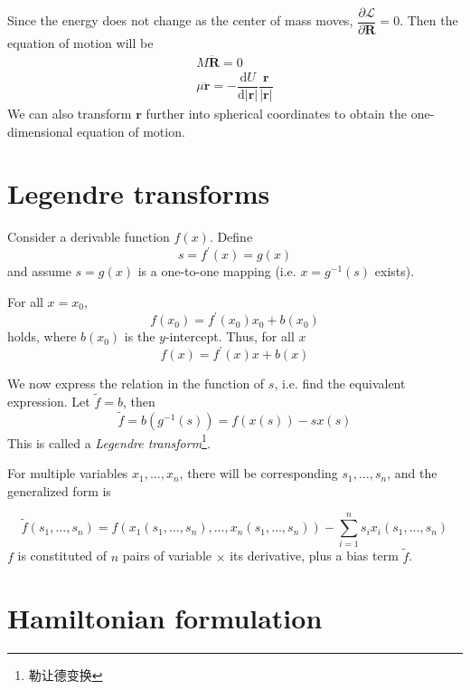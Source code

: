 \documentclass[
  10pt,
  twoside,
  openany,
  b5paper, %
  colorscheme = bootstrap-v4, %
]{qyxf-book}
\numberwithin{equation}{section}
\newcommand{\md}{\mathrm{d}}
\newcommand{\der}[2]{\dfrac{\md #1}{\md #2}}
\newcommand{\p}[2]{\dfrac{\partial #1}{\partial #2}}
\newcommand{\vr}{\boldsymbol{r}}
\newcommand{\ddvr}{\ddot{\vr}}
\newcommand{\lag}{\mathcal{L}} %
\begin{document}
Since the energy does not change as the center of mass moves, $\p{\lag}{\boldsymbol{R}}=0$. Then the equation of motion will be
\begin{gather*}
	M\ddot{\boldsymbol{R}}=0\\
	\mu\ddvr=-\der{U}{|\vr|}\dfrac{\vr}{|\vr|}
\end{gather*}
We can also transform $\vr$ further into spherical coordinates to obtain the one-dimensional equation of motion.

\section{Legendre transforms}

Consider a derivable function $f(x)$. Define
\begin{equation}
	s=f^\prime(x)=g(x)
\end{equation}
and assume $s=g(x)$ is a one-to-one mapping (i.e. $x=g^{-1}(s)$ exists).

For all $x=x_0$, 
\begin{equation*}
	f(x_0)=f^\prime(x_0)x_0+b(x_0)
\end{equation*}
holds, where $b(x_0)$ is the $y$-intercept. Thus, for all $x$
\begin{equation}
	f(x)=f^\prime(x)x+b(x)
\end{equation}

We now express the relation in the function of $s$, i.e. find the equivalent expression. Let $\tilde{f}=b$, then
\begin{equation}
	\tilde{f}=b(g^{-1}(s))=f(x(s))-sx(s)
\end{equation}
This is called a \textit{Legendre transform}\footnote{勒让德变换}.

For multiple variables $x_1, \dots, x_n$, there will be corresponding $s_1, \dots, s_n$, and the generalized form is
\begin{tcolorbox}
	\begin{equation}
		\tilde{f}(s_1, \dots, s_n)=f(x_1(s_1, \dots, s_n),\dots,x_n(s_1, \dots, s_n))-\sum_{i=1}^{n}s_ix_i(s_1, \dots, s_n)
	\end{equation}
	$f$ is constituted of $n$ pairs of variable $\times$ its derivative, plus a bias term $\tilde{f}$.
\end{tcolorbox}

\section{Hamiltonian formulation}
\end{document}
